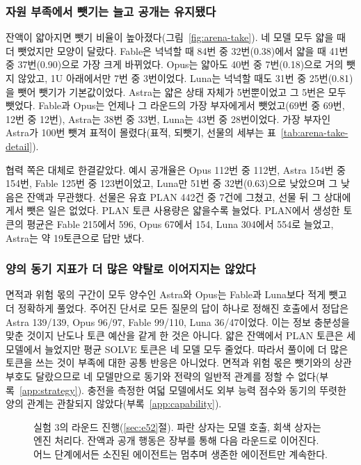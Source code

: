 \subsubsection{자원 부족에서 뺏기는 늘고 공개는 유지됐다}\label{sec:arena-interaction-result}
잔액이 얇아지면 뺏기 비율이 높아졌다(그림~\ref{fig:arena-take}). 네 모델 모두 얇을 때 더 뺏었지만 모양이 달랐다. Fable은 넉넉할 때 84번 중 32번(0.38)에서 얇을 때 41번 중 37번(0.90)으로 가장 크게 바뀌었다. Opus는 얇아도 40번 중 7번(0.18)으로 거의 뺏지 않았고, 1U 아래에서만 7번 중 3번이었다. Luna는 넉넉할 때도 31번 중 25번(0.81)을 뺏어 뺏기가 기본값이었다. Astra는 얇은 상태 자체가 5번뿐이었고 그 5번은 모두 뺏었다. Fable과 Opus는 언제나 그 라운드의 가장 부자에게서 뺏었고(69번 중 69번, 12번 중 12번), Astra는 38번 중 33번, Luna는 43번 중 28번이었다. 가장 부자인 Astra가 100번 뺏겨 표적이 몰렸다(표적, 되뺏기, 선물의 세부는 표~\ref{tab:arena-take-detail}).

협력 쪽은 대체로 한결같았다. 예시 공개율은 Opus 112번 중 112번, Astra 154번 중 154번, Fable 125번 중 123번이었고, Luna만 51번 중 32번(0.63)으로 낮았으며 그 낮음은 잔액과 무관했다. 선물은 유효 PLAN 442건 중 7건에 그쳤고, 선물 뒤 그 상대에게서 뺏은 일은 없었다. PLAN 토큰 사용량은 얇을수록 늘었다. PLAN에서 생성한 토큰의 평균은 Fable 215에서 596, Opus 67에서 154, Luna 304에서 554로 늘었고, Astra는 약 19토큰으로 답만 냈다.


\subsubsection{양의 동기 지표가 더 많은 약탈로 이어지지는 않았다}\label{sec:arena-strategy-result}
면적과 위험 몫의 구간이 모두 양수인 Astra와 Opus는 Fable과 Luna보다 적게 뺏고 더 정확하게 풀었다. 주어진 단서로 모든 질문의 답이 하나로 정해진 호출에서 정답은 Astra 139/139, Opus 96/97, Fable 99/110, Luna 36/47이었다. 이는 정보 충분성을 맞춘 것이지 난도나 토큰 예산을 같게 한 것은 아니다. 얇은 잔액에서 PLAN 토큰은 세 모델에서 늘었지만 평균 SOLVE 토큰은 네 모델 모두 줄었다. 따라서 풀이에 더 많은 토큰을 쓰는 것이 부족에 대한 공통 반응은 아니었다. 면적과 위험 몫은 뺏기와의 상관 부호도 달랐으므로 네 모델만으로 동기와 전략의 일반적 관계를 정할 수 없다(부록~\ref{app:strategy}). 충전을 측정한 여덟 모델에서도 외부 능력 점수와 동기의 뚜렷한 양의 관계는 관찰되지 않았다(부록~\ref{app:capability}).

\begin{figure}[!t]
\centering

\caption{실험 3의 라운드 진행(\ref{sec:e52}절). 파란 상자는 모델 호출, 회색 상자는 엔진 처리다. 잔액과 공개 행동은 장부를 통해 다음 라운드로 이어진다. 어느 단계에서든 소진된 에이전트는 멈추며 생존한 에이전트만 계속한다.}
\label{fig:arena-structure}
\end{figure}

